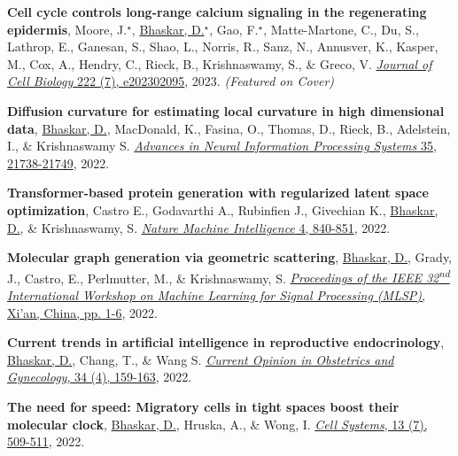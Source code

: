 \documentclass[margin,line]{res}
\begin{document}
\begin{resume}
{\begin{etaremune}[start=20]
\item{\bf Cell cycle controls long-range calcium signaling in the regenerating epidermis}, 
Moore, J.$^\star$, \underline{Bhaskar, D.}$^\star$, Gao, F.$^\star$, Matte-Martone, C., Du, S., Lathrop, E., Ganesan, S., Shao, L., Norris, R., Sanz, N., Annusver, K., Kasper, M., Cox, A., Hendry, C., Rieck, B., Krishnaswamy, S., \& Greco, V.
\href{https://doi.org/10.1083/jcb.202302095}{\textit{Journal of Cell Biology} 222 (7), e202302095}, 2023. \hfill \textit{(Featured on Cover)}
\vspace*{.1cm}

\item{\bf Diffusion curvature for estimating local curvature in high dimensional data},
\underline{Bhaskar, D.}, MacDonald, K., Fasina, O., Thomas, D., Rieck, B., Adelstein, I., \& Krishnaswamy S.
\href{https://proceedings.neurips.cc/paper_files/paper/2022/hash/88438dc62fc5c8777e2b5f1b4f6d37a2-Abstract-Conference.html}{\textit{Advances in Neural Information Processing Systems} 35, 21738-21749}, 2022.
\vspace*{.1cm}

\item{\bf Transformer-based protein generation with regularized latent space optimization}, 
Castro E., Godavarthi A., Rubinfien J., Givechian K., \underline{Bhaskar, D.}, \& Krishnaswamy, S.
\href{https://www.nature.com/articles/s42256-022-00532-1}{\textit{Nature Machine Intelligence} 4, 840-851}, 2022.
\vspace*{.1cm}

\item{\bf Molecular graph generation via geometric scattering},
\underline{Bhaskar, D.}, Grady, J., Castro, E., Perlmutter, M., \& Krishnaswamy, S.
\href{https://doi.org/10.1109/MLSP55214.2022.9943379}{\textit{Proceedings of the IEEE 32\textsuperscript{nd} International Workshop on Machine Learning for Signal Processing (MLSP)}, Xi'an, China, pp. 1-6}, 2022.
\vspace*{.1cm}

\item{\bf Current trends in artificial intelligence in reproductive endocrinology},
\underline{Bhaskar, D.}, Chang, T., \& Wang S.
\href{https://doi.org/10.1097/GCO.0000000000000796}{\textit{Current Opinion in Obstetrics and Gynecology}, 34 (4), 159-163}, 2022.
\vspace*{.1cm}

\item{\bf The need for speed: Migratory cells in tight spaces boost their molecular clock},
\underline{Bhaskar, D.}, Hruska, A., \& Wong, I.
\href{https://doi.org/10.1016/j.cels.2022.06.002}{\textit{Cell Systems}, 13 (7), 509-511}, 2022.
\vspace*{.1cm}


\end{etaremune}}
\end{resume}
\end{document}
